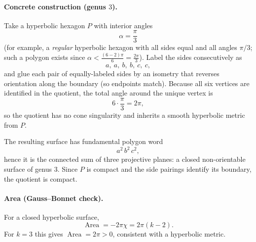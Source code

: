 \documentclass[12pt,a4paper]{article}
\DeclareMathOperator{\Area}{Area}
\theoremstyle{plain}
\theoremstyle{definition}      %
\begin{document}
	\paragraph{Concrete construction (genus $3$).}
	Take a hyperbolic hexagon $P$ with interior angles
	\[
	\alpha=\frac{\pi}{3}
	\]
	(for example, a \emph{regular} hyperbolic hexagon with all sides equal and all angles $\pi/3$; such a polygon exists since
	$\alpha<\frac{(6-2)\pi}{6}=\frac{2\pi}{3}$).
	Label the sides consecutively as
	\[
	a,\ a,\ b,\ b,\ c,\ c,
	\]
	and glue each pair of equally-labeled sides by an isometry that reverses orientation along the boundary
	(so endpoints match). Because all six vertices are identified in the quotient, the total angle around the unique
	vertex is
	\[
	6\cdot \frac{\pi}{3}=2\pi,
	\]
	so the quotient has no cone singularity and inherits a smooth hyperbolic metric from $P$.
	
	The resulting surface has fundamental polygon word
	\[
	a^2\,b^2\,c^2,
	\]
	hence it is the connected sum of three projective planes: a closed non-orientable surface of genus $3$.
	Since $P$ is compact and the side pairings identify its boundary, the quotient is compact.
	
	\paragraph{Area (Gauss--Bonnet check).}
	For a closed hyperbolic surface,
	\[
	\Area = -2\pi\chi = 2\pi(k-2).
	\]
	For $k=3$ this gives $\Area=2\pi>0$, consistent with a hyperbolic metric.
	
\end{document}
